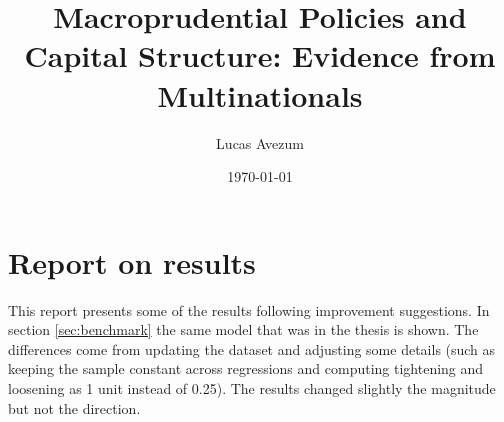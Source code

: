 \documentclass[12pt]{article}
\begin{document}
	
		\title{Macroprudential Policies and Capital Structure: Evidence from Multinationals}
		\author{Lucas Avezum}
		\date{\today}
		\maketitle
			
	
	
	
	
	\doublespacing
	


	 
	\section{Report on results} \label{sec:result}
	 This report presents some  of the results following improvement suggestions. In section \ref{sec:benchmark} the same model that was in the thesis is shown. The differences come from updating the dataset and adjusting some details (such as keeping the sample constant across regressions and computing tightening and loosening as 1 unit instead of 0.25). The results changed slightly the magnitude but not the direction.
	 
\end{document}
